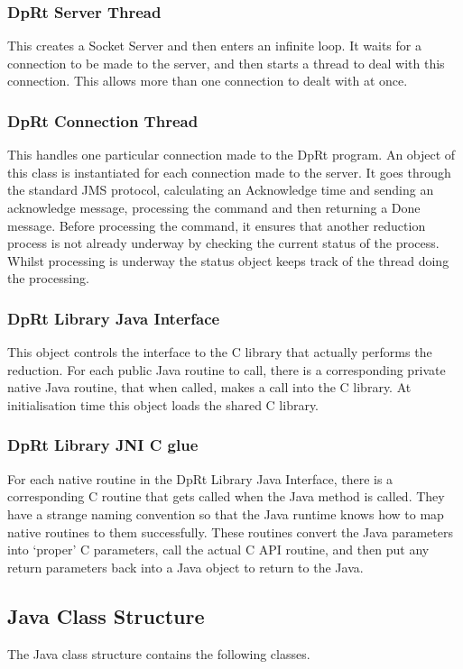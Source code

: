 \documentclass[10pt,a4paper]{article}
\begin{document}
\subsubsection{DpRt Server Thread}
This creates a Socket Server and then enters an infinite loop. It waits for a connection to be made to the server,
and then starts a thread to deal with this connection. This allows more than one connection to dealt with 
at once.

\subsubsection{DpRt Connection Thread}
This handles one particular connection made to the DpRt program. An object of this class is instantiated for
each connection made to the server. It goes through the standard JMS protocol, calculating an Acknowledge time and
sending an acknowledge message, processing the command and then returning a Done message. Before processing the
command, it ensures that another reduction process is not already underway by checking the current
status of the process. Whilst processing is underway the status object keeps track of the thread doing the 
processing.

\subsubsection{DpRt Library Java Interface}
This object controls the interface to the C library that actually performs the reduction. For each public
Java routine to call, there is a corresponding private native Java routine, that when called, makes a call
into the C library. At initialisation time this object loads the shared C library. 

\subsubsection{DpRt Library JNI C glue}
For each native routine in the DpRt Library Java Interface, there is a corresponding C routine that gets called when
the Java method is called. They have a strange naming convention so that the Java runtime knows how to map
native routines to them successfully. These routines convert the Java parameters into `proper' C parameters, call
the actual C API routine, and then put any return parameters back into a Java object to return to the Java.

\subsection{Java Class Structure}
The Java class structure contains the following classes.
\end{document}
